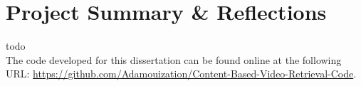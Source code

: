     

\section{Project Summary \& Reflections}

todo\\

The code developed for this dissertation can be found online at the following URL: \url{https://github.com/Adamouization/Content-Based-Video-Retrieval-Code}.